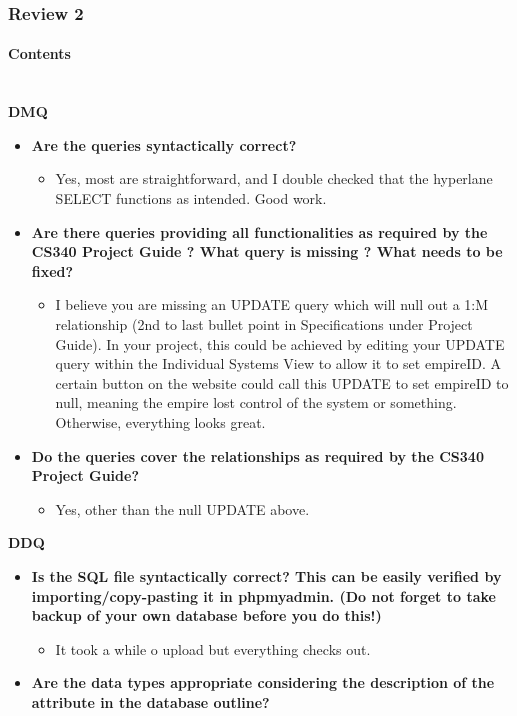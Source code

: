 \documentclass[12pt]{article}
\newcommand{\hparagraph}[1]{\paragraph{#1}\mbox{}\vspace{0.75em}\\}
\begin{document}
\begin{appendices}
\newpage
\subsubsection{Review 2}
\hparagraph{Contents}
\textbf{DMQ}
\begin{itemize}
    \item \textbf{Are the queries syntactically correct?}
    \begin{itemize}
        \item Yes, most are straightforward, and I double checked that the hyperlane SELECT functions as intended. Good work.
    \end{itemize}
    \item \textbf{Are there queries providing all functionalities as required by the CS340 Project Guide ? What query is missing ? What needs to be fixed?}
    \begin{itemize}
        \item I believe you are missing an UPDATE query which will null out a 1:M relationship (2nd to last bullet point in Specifications under Project Guide). In your project, this could be achieved by editing your UPDATE query within the Individual Systems View to allow it to set empireID. A certain button on the website could call this UPDATE to set empireID to null, meaning the empire lost control of the system or something. Otherwise, everything looks great.
    \end{itemize}
    \item \textbf{Do the queries cover the relationships as required by the CS340 Project Guide?}
    \begin{itemize}
        \item Yes, other than the null UPDATE above.
    \end{itemize}
\end{itemize}
\textbf{DDQ}
\begin{itemize}
    \item \textbf{Is the SQL file syntactically correct? This can be easily verified by importing/copy-pasting it in phpmyadmin. (Do not forget to take backup of your own database before you do this!)}
    \begin{itemize}
        \item It took a while o upload but everything checks out.
    \end{itemize}
    \item \textbf{Are the data types appropriate considering the description of the attribute in the database outline?}
    \begin{itemize}

\end{itemize}
\end{itemize}
\end{appendices}
\end{document}
